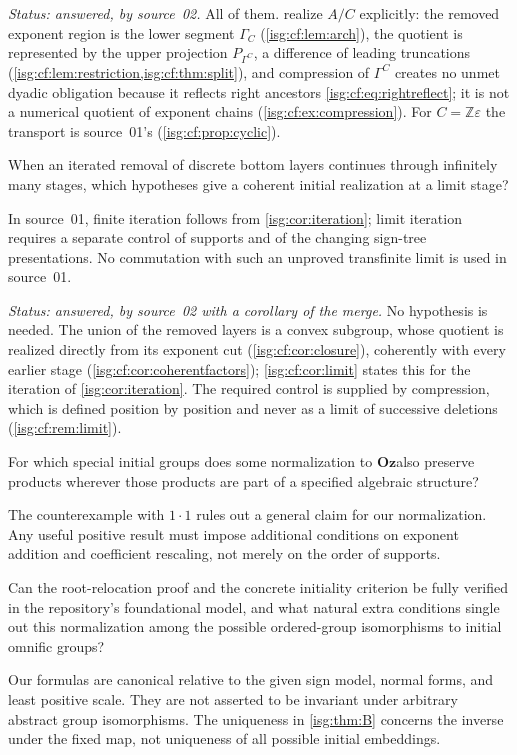 \documentclass[11pt]{article}
\theoremstyle{definition}
\theoremstyle{remark}
\newcommand{\Oz}{\ensuremath{\mathbf{Oz}}}
\newcommand{\Z}{\mathbb{Z}}
\begin{document}
\emph{Status: answered, by source~02.} All of them.
 realize $A/C$ explicitly:
the removed exponent region is the lower segment $\Gamma_C$
(\cref{isg:cf:lem:arch}), the quotient is represented by the upper
projection $P_{\Gamma^C}$, a difference of leading truncations
(\cref{isg:cf:lem:restriction,isg:cf:thm:split}), and compression of
$\Gamma^C$ creates no unmet dyadic obligation because it reflects right
ancestors \eqref{isg:cf:eq:rightreflect}; it is not a numerical quotient
of exponent chains (\cref{isg:cf:ex:compression}). For
$C=\Z\varepsilon$ the transport is source~01's
(\cref{isg:cf:prop:cyclic}).

\begin{question}\label{isg:q:limit}
When an iterated removal of discrete bottom layers continues through
infinitely many stages, which hypotheses give a coherent initial
realization at a limit stage?
\end{question}
In source~01, finite iteration follows from \cref{isg:cor:iteration};
limit iteration requires a separate control of supports and of the
changing sign-tree presentations. No commutation with such an unproved
transfinite limit is used in source~01.

\emph{Status: answered, by source~02 with a corollary of the merge.} No
hypothesis is needed. The union of the removed layers is a convex
subgroup, whose quotient is realized directly from its exponent cut
(\cref{isg:cf:cor:closure}), coherently with every earlier stage
(\cref{isg:cf:cor:coherentfactors}); \cref{isg:cf:cor:limit} states this
for the iteration of \cref{isg:cor:iteration}. The required control is
supplied by compression, which is defined position by position and never
as a limit of successive deletions (\cref{isg:cf:rem:limit}).

\begin{question}\label{isg:q:multiplicative}
For which special initial groups does some normalization to \Oz also
preserve products wherever those products are part of a specified
algebraic structure?
\end{question}
The counterexample with $1\cdot1$ rules out a general claim for our
normalization. Any useful positive result must impose additional
conditions on exponent addition and coefficient rescaling, not merely
on the order of supports.

\begin{question}\label{isg:q:formal}
Can the root-relocation proof and the concrete initiality criterion be
fully verified in the repository's foundational model, and what natural
extra conditions single out this normalization among the possible
ordered-group isomorphisms to initial omnific groups?
\end{question}
Our formulas are canonical relative to the given sign model, normal
forms, and least positive scale. They are not asserted to be invariant
under arbitrary abstract group isomorphisms. The uniqueness in
\cref{isg:thm:B} concerns the inverse under the fixed map, not uniqueness of
all possible initial embeddings.
\end{document}
